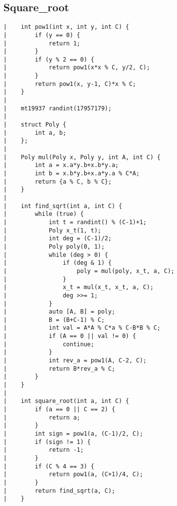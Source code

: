 \documentclass[a4paper, 10pt]{article}
\begin{document}
\begin{center}
\section*{Square\_root}
\begin{verbatim}
|    int pow1(int x, int y, int C) {
|        if (y == 0) {
|            return 1;
|        }
|        if (y % 2 == 0) {
|            return pow1(x*x % C, y/2, C);
|        }
|        return pow1(x, y-1, C)*x % C;
|    }
|    
|    mt19937 randint(17957179);
|    
|    struct Poly {
|        int a, b;
|    };
|    
|    Poly mul(Poly x, Poly y, int A, int C) {
|        int a = x.a*y.b+x.b*y.a;
|        int b = x.b*y.b+x.a*y.a % C*A;
|        return {a % C, b % C};
|    }
|    
|    int find_sqrt(int a, int C) {
|        while (true) {
|            int t = randint() % (C-1)+1;
|            Poly x_t(1, t);
|            int deg = (C-1)/2;
|            Poly poly(0, 1);
|            while (deg > 0) {
|                if (deg & 1) {
|                    poly = mul(poly, x_t, a, C);
|                }
|                x_t = mul(x_t, x_t, a, C);
|                deg >>= 1;
|            }
|            auto [A, B] = poly;
|            B = (B+C-1) % C;
|            int val = A*A % C*a % C-B*B % C;
|            if (A == 0 || val != 0) {
|                continue;
|            }
|            int rev_a = pow1(A, C-2, C);
|            return B*rev_a % C;
|        }
|    }
|    
|    int square_root(int a, int C) {
|        if (a == 0 || C == 2) {
|            return a;
|        }
|        int sign = pow1(a, (C-1)/2, C);
|        if (sign != 1) {
|            return -1;
|        }
|        if (C % 4 == 3) {
|            return pow1(a, (C+1)/4, C);
|        }
|        return find_sqrt(a, C);
|    }
\end{verbatim}


\end{center}
\end{document}
